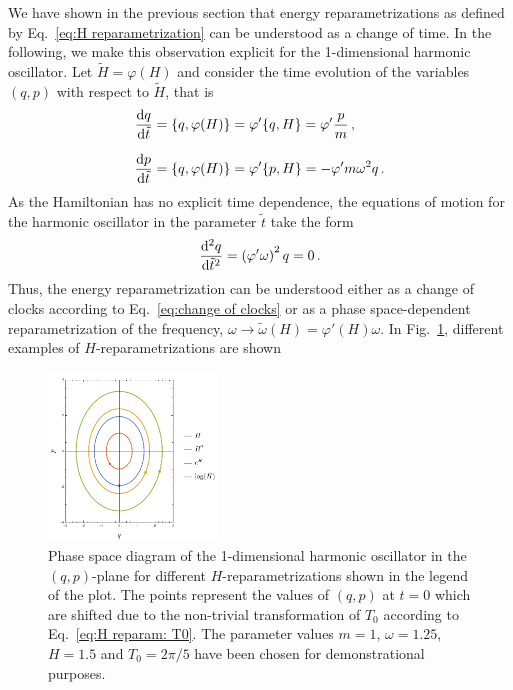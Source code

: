 \documentclass[twocolumn,notitlepage,superscriptaddress, nofootinbib,nobibnotes, aps,prd,10pt]{revtex4-1}%
\begin{document}
We have shown in the previous section that energy reparametrizations as defined by Eq.~\eqref{eq:H reparametrization} can be understood as a change of time. In the following, we make this observation explicit for the 1-dimensional harmonic oscillator. Let $\tilde{H} = \varphi(H)$ and consider the time evolution of the variables $(q,p)$ with respect to $\tilde{H}$, that is
%
\begin{subequations}
\begin{align}
    \dv{q}{\tilde{t}} &= \{q,\varphi(H)\} = \varphi'\{q,H\} = \varphi'\frac{p}{m}\, ,\\[7pt] 
    \dv{p}{\tilde{t}} &= \{q,\varphi(H)\} = \varphi'\{p,H\} = -\varphi'm\omega^2 q\, .
\end{align}
\end{subequations}
%
As the Hamiltonian has no explicit time dependence, the equations of motion for the harmonic oscillator in the parameter $\tilde{t}$ take the form
%
\begin{equation}
\dv[2]{q}{\tilde{t}} = \left(\varphi'\omega\right)^2q = 0\, .
\end{equation}
%
Thus, the energy reparametrization can be understood either as a change of clocks according to Eq.~\eqref{eq:change of clocks} or as a phase space-dependent reparametrization of the frequency, $\omega\rightarrow \tilde{\omega}(H) = \varphi'(H)\omega$. In Fig.~\ref{fig:H reparam}, different examples of $H$-reparametrizations are shown

\begin{figure}
    \centering
    \includegraphics[width=0.4\textwidth]{figures/Hreparam.pdf}
    \caption{Phase space diagram of the 1-dimensional harmonic oscillator in the $(q,p)$-plane for different $H$-reparametrizations shown in the legend of the plot. The points represent the values of $(q,p)$ at $t = 0$ which are shifted due to the non-trivial transformation of $T_0$ according to Eq.~\eqref{eq:H reparam: T0}.  The parameter values $m=1$, $\omega = 1.25$, $H = 1.5$ and $T_0 = 2\pi/5$ have been chosen for demonstrational purposes.}
    \label{fig:H reparam}
\end{figure}
\end{document}
